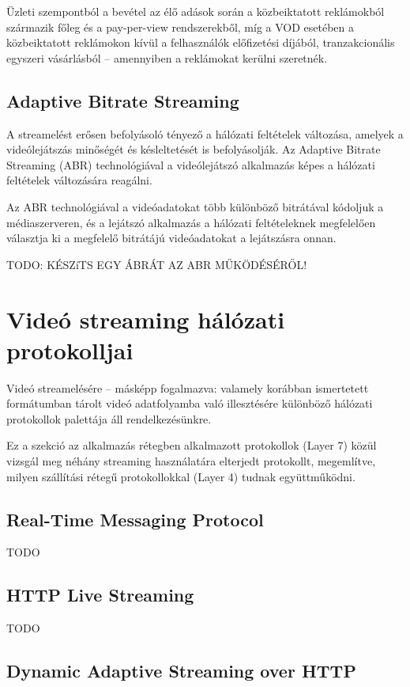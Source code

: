 Üzleti szempontból a bevétel az élő adások során a közbeiktatott reklámokból származik főleg és a pay-per-view rendszerekből, míg a VOD esetében a közbeiktatott reklámokon kívül a felhasználók előfizetési díjából, tranzakcionális egyszeri vásárlásból -- amennyiben a reklámokat kerülni szeretnék.

\subsection{Adaptive Bitrate Streaming}

A streamelést erősen befolyásoló tényező a hálózati feltételek változása, amelyek a videólejátszás minőségét és késleltetését is befolyásolják. Az Adaptive Bitrate Streaming (ABR) technológiával a videólejátszó alkalmazás képes a hálózati feltételek változására reagálni.

Az ABR technológiával a videóadatokat több különböző bitrátával kódoljuk a médiaszerveren, és a lejátszó alkalmazás a hálózati feltételeknek megfelelően választja ki a megfelelő bitrátájú videóadatokat a lejátszásra onnan.

TODO: KÉSZíTS EGY ÁBRÁT AZ ABR MŰKÖDÉSÉRŐL!

\section{Videó streaming hálózati protokolljai}

Videó streamelésére -- másképp fogalmazva: valamely korábban ismertetett formátumban tárolt videó adatfolyamba való illesztésére különböző hálózati protokollok palettája áll rendelkezésünkre.\cite{Wettl04}

Ez a szekció az alkalmazás rétegben alkalmazott protokollok (Layer 7) közül vizsgál meg néhány streaming használatára elterjedt protokollt, megemlítve, milyen szállítási rétegű protokollokkal (Layer 4) tudnak együttműködni.

\subsection{Real-Time Messaging Protocol}

TODO

\subsection{HTTP Live Streaming}

TODO

\subsection{Dynamic Adaptive Streaming over HTTP}


